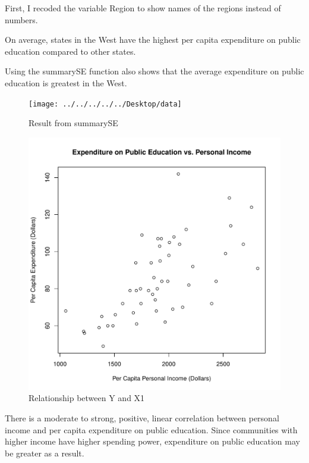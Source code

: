 \documentclass[12pt,letterpaper]{article}
\begin{document}
\begin{itemize}
\noindent First, I recoded the variable Region to show names of the regions instead of numbers.



\noindent On average, states in the West have the highest per capita expenditure on public education compared to other states. 

\vspace{0.5cm}

\noindent Using the summarySE function also shows that the average expenditure on public education is greatest in the West.



\begin{figure} [h]
	\centering
	\texttt{[image: ../../../../../Desktop/data]}
	\caption{Result from summarySE}
	\label{fig:data}
\end{figure}

\newpage
\begin{figure} [h]
	\centering
	\includegraphics[width=0.7\linewidth]{Graph4}
	\caption{Relationship between Y and X1 }
	\label{fig:graph2}
\end{figure}

\noindent There is a moderate to strong, positive, linear correlation between personal income and per capita expenditure on public education. Since communities with higher income have higher spending power, expenditure on public education may be greater as a result.


\end{itemize}
\end{document}
